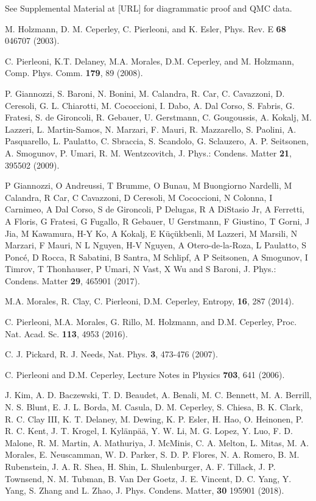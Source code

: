 \begin{thebibliography}{99}
 See Supplemental Material at [URL] for diagrammatic proof and QMC data.

 M. Holzmann, D. M. Ceperley, C. Pierleoni, and K. Esler, Phys. Rev. E {\bf68} 046707 (2003).

 C. Pierleoni, K.T. Delaney, M.A. Morales, D.M. Ceperley, and M. Holzmann,
Comp. Phys. Comm. {\bf 179}, 89 (2008).

 P. Giannozzi, S. Baroni, N. Bonini, M. Calandra, R. Car, C. Cavazzoni, D. Ceresoli, G. L. Chiarotti, M. Cococcioni, I. Dabo, A. Dal Corso, S. Fabris, G. Fratesi, S. de Gironcoli, R. Gebauer, U. Gerstmann, C. Gougoussis, A. Kokalj, M. Lazzeri, L. Martin-Samos, N. Marzari, F. Mauri, R. Mazzarello, S. Paolini, A. Pasquarello, L. Paulatto, C. Sbraccia, S. Scandolo, G. Sclauzero, A. P. Seitsonen, A. Smogunov, P. Umari, R. M. Wentzcovitch, J. Phys.: Condens. Matter {\bf21}, 395502 (2009).

 P Giannozzi, O Andreussi, T Brumme, O Bunau, M Buongiorno Nardelli, M Calandra, R Car, C Cavazzoni, D Ceresoli, M Cococcioni, N Colonna, I Carnimeo, A Dal Corso, S de Gironcoli, P Delugas, R A DiStasio Jr, A Ferretti, A Floris, G Fratesi, G Fugallo, R Gebauer, U Gerstmann, F Giustino, T Gorni, J Jia, M Kawamura, H-Y Ko, A Kokalj, E K\"{u}\c{c}\"{u}kbenli, M Lazzeri, M Marsili, N Marzari, F Mauri, N L Nguyen, H-V Nguyen, A Otero-de-la-Roza, L Paulatto, S Ponc\'{e}, D Rocca, R Sabatini, B Santra, M Schlipf, A P Seitsonen, A Smogunov, I Timrov, T Thonhauser, P Umari, N Vast, X Wu and S Baroni, J. Phys.: Condens. Matter {\bf29}, 465901 (2017).

 M.A. Morales, R. Clay, C. Pierleoni, D.M. Ceperley, Entropy, {\bf 16}, 287 (2014).

 C. Pierleoni, M.A. Morales, G. Rillo, M. Holzmann, and D.M. Ceperley, Proc. Nat. Acad. Sc. {\bf 113}, 4953 (2016).

 C. J. Pickard, R. J. Needs, Nat. Phys. {\bf3}, 473-476 (2007).

 C. Pierleoni and D.M. Ceperley,
 Lecture Notes in Physics {\bf 703}, 641 (2006).

 J. Kim, A. D. Baczewski, T. D. Beaudet, A. Benali, M. C. Bennett, M. A. Berrill, N. S. Blunt, E. J. L. Borda, M. Casula, D. M. Ceperley, S. Chiesa, B. K. Clark, R. C. Clay III, K. T. Delaney, M. Dewing, K. P. Esler, H. Hao, O. Heinonen, P. R. C. Kent, J. T. Krogel, I. Kyl\"{a}np\"{a}\"{a}, Y. W. Li, M. G. Lopez, Y. Luo, F. D. Malone, R. M. Martin, A. Mathuriya, J. McMinis, C. A. Melton, L. Mitas, M. A. Morales, E. Neuscamman, W. D. Parker, S. D. P. Flores, N. A. Romero, B. M. Rubenstein, J. A. R. Shea, H. Shin, L. Shulenburger, A. F. Tillack, J. P. Townsend, N. M. Tubman, B. Van Der Goetz, J. E. Vincent, D. C. Yang, Y. Yang, S. Zhang and L. Zhao,
J. Phys. Condens. Matter, {\bf30} 195901 (2018).


\end{thebibliography}
